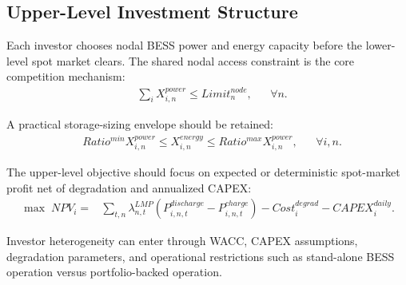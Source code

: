 \documentclass[11pt,a4paper,fleqn]{article}
\begin{document}
\subsection*{Upper-Level Investment Structure}

\noindent Each investor chooses nodal BESS power and energy capacity before the lower-level spot market clears. The shared nodal access constraint is the core competition mechanism:
\begin{align*}
&\sum_i X^{power}_{i,n} \le Limit^{node}_n,
  &&\forall n.
\end{align*}

\noindent A practical storage-sizing envelope should be retained:
\begin{align*}
&Ratio^{min} X^{power}_{i,n}
\le
X^{energy}_{i,n}
\le
Ratio^{max} X^{power}_{i,n},
&&\forall i,n.
\end{align*}

\noindent The upper-level objective should focus on expected or deterministic spot-market profit net of degradation and annualized CAPEX:
\begin{align*}
\max \; NPV_i
=&
\sum_{t,n}
\lambda^{LMP}_{n,t}
\left(P^{discharge}_{i,n,t}-P^{charge}_{i,n,t}\right)
- Cost^{degrad}_i
- CAPEX^{daily}_i.
\end{align*}

\noindent Investor heterogeneity can enter through WACC, CAPEX assumptions, degradation parameters, and operational restrictions such as stand-alone BESS operation versus portfolio-backed operation.
\end{document}
